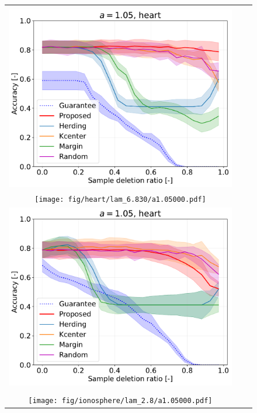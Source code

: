 \begin{figure}[H]
\begin{tabular}{ccc}
	\begin{minipage}[b]{0.3\hsize}\centering {\small Dataset: heart, $\lambda=\lambda_\mathrm{best}$}\\\includegraphics[width=0.8\hsize]{fig/heart/lam_7.0/a1.05000.pdf}\end{minipage}
	&
	\begin{minipage}[b]{0.3\hsize}\centering {\small Dataset: heart, $\lambda=n \cdot 10^{-1.5}$}\\\texttt{[image: fig/heart/lam\_6.830/a1.05000.pdf]}\end{minipage}
	&
	\begin{minipage}[b]{0.3\hsize}\centering {\small Dataset: heart, $\lambda=n$}\\\includegraphics[width=0.8\hsize]{fig/heart/lam_216/a1.05000.pdf}\end{minipage}
	\\
	\begin{minipage}[b]{0.3\hsize}\centering {\small Dataset: ionosphere, $\lambda=\lambda_\mathrm{best}$}\\\texttt{[image: fig/ionosphere/lam\_2.8/a1.05000.pdf]}\end{minipage}

\end{tabular}
\end{figure}
